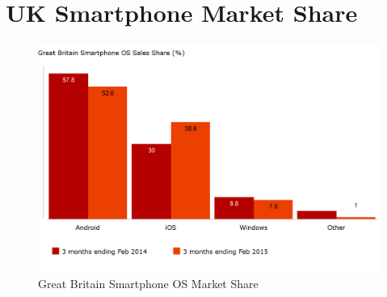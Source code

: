 \chapter{UK Smartphone Market Share}
\label{appendix:uksmartphonemarketshare}

\begin{figure}[ht]
	\centering
	\includegraphics[scale=0.25]{images/UKSmartphoneSales.png}
	\caption{Great Britain Smartphone OS Market Share \citep{kantargbsmartphonereport}}
\end{figure}